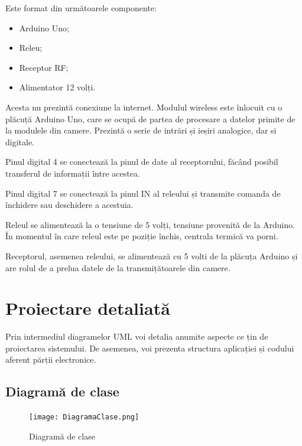 Este format din următoarele componente:
	\begin{itemize}
		\setlength{\itemindent}{2em}
			\itemsep0em
			\item Arduino Uno;
			\item Releu;
			\item Receptor RF;
			\item Alimentator 12 volți.
	\end{itemize}

	Acesta nu prezintă conexiune la internet. Modulul wireless este înlocuit cu o plăcuță Arduino Uno, care se ocupă de partea de procesare a datelor primite de la modulele din camere. Prezintă o serie de intrări și ieșiri analogice, dar si digitale. 

	Pinul digital 4 se conectează la pinul de date al receptorului, făcând posibil transferul de informații între acestea.
	
	Pinul digital 7 se conectează la pinul IN al releului și transmite comanda de închidere sau deschidere a acestuia.

\vspace{1em}

	Releul se alimentează la o tensiune de 5 volți, tensiune provenită de la Arduino. În momentul în care releul este pe poziție închis, centrala termică va porni.

\vspace{1em}

	Receptorul, asemenea releului, se alimentează cu 5 volti de la plăcuța Arduino și are rolul de a prelua datele de la transmițătoarele din camere.

\section{Proiectare detaliată}

	Prin intermediul diagramelor UML voi detalia anumite aspecte ce țin de proiectarea sistemului. De asemenea, voi prezenta structura aplicației și codului aferent părții electronice.

\subsection{Diagramă de clase}

\begin{figure}[H]
   	\centering
    	\texttt{[image: DiagramaClase.png]}
	\caption{Diagramă de clase}
	\label{fig:DiagramaClase}
\end{figure}


